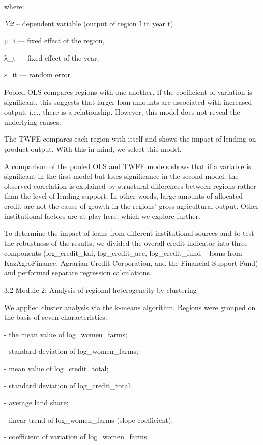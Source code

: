 \documentclass[
]{article}
\begin{document}
where:

\emph{Yit}\hspace{0pt} -- dependent variable (output of region I in year
t)

μ\_i --- fixed effect of the region,

λ\_t --- fixed effect of the year,

ε\_it --- random error

Pooled OLS compares regions with one another. If the coefficient of
variation is significant, this suggests that larger loan amounts are
associated with increased output, i.e., there is a relationship.
However, this model does not reveal the underlying causes.

The TWFE compares each region with itself and shows the impact of
lending on product output. With this in mind, we select this model.

A comparison of the pooled OLS and TWFE models shows that if a variable
is significant in the first model but loses significance in the second
model, the observed correlation is explained by structural differences
between regions rather than the level of lending support. In other
words, large amounts of allocated credit are not the cause of growth in
the regions' gross agricultural output. Other institutional factors are
at play here, which we explore further.

To determine the impact of loans from different institutional sources
and to test the robustness of the results, we divided the overall credit
indicator into three components (log\_credit\_kaf, log\_credit\_acc,
log\_credit\_fund -- loans from KazAgroFinance, Agrarian Credit
Corporation, and the Financial Support Fund) and performed separate
regression calculations.

3.2 Module 2: Analysis of regional heterogeneity by clustering

We applied cluster analysis via the k-means algorithm. Regions were
grouped on the basis of seven characteristics:

- the mean value of log\_women\_farms;

- standard deviation of log\_women\_farms;

- mean value of log\_credit\_total;

- standard deviation of log\_credit\_total;

- average land share;

- linear trend of log\_women\_farms (slope coefficient);

- coefficient of variation of log\_women\_farms.
\end{document}
